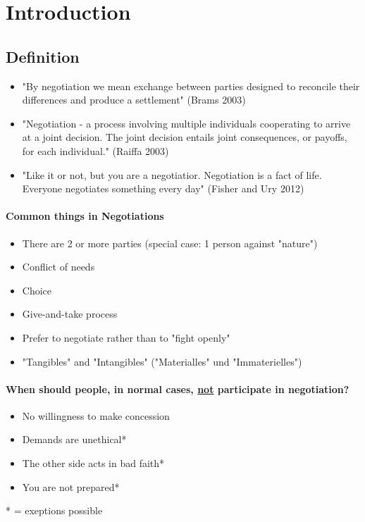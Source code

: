 \section{Introduction}

\subsection{Definition}

\begin{definition}[Negotiation]
    \begin{itemize}
        \item "By negotiation we mean exchange between parties designed to reconcile
            their differences and produce a settlement" (Brams 2003)
        \item "Negotiation - a process involving multiple individuals cooperating to
            arrive at a joint decision. The joint decision entails joint consequences,
            or payoffs, for each individual." (Raiffa 2003)
        \item "Like it or not, but you are a negotiatior. Negotiation is a fact
            of life. Everyone negotiates something every day" (Fisher and Ury 2012)
    \end{itemize}
\end{definition}

\paragraph{Common things in Negotiations}
\begin{itemize}
    \item There are 2 or more parties (special case: 1 person against "nature")
    \item Conflict of needs
    \item Choice
    \item Give-and-take process
    \item Prefer to negotiate rather than to "fight openly"
    \item "Tangibles" and "Intangibles" ("Materialles" und "Immaterielles")
\end{itemize}

\paragraph{When should people, in normal cases, \underline{not} participate in negotiation?}
\begin{itemize}
    \item No willingness to make concession
    \item Demands are unethical*
    \item The other side acts in bad faith*
    \item You are not prepared*
\end{itemize}
\hspace{15pt} * = exeptions possible

